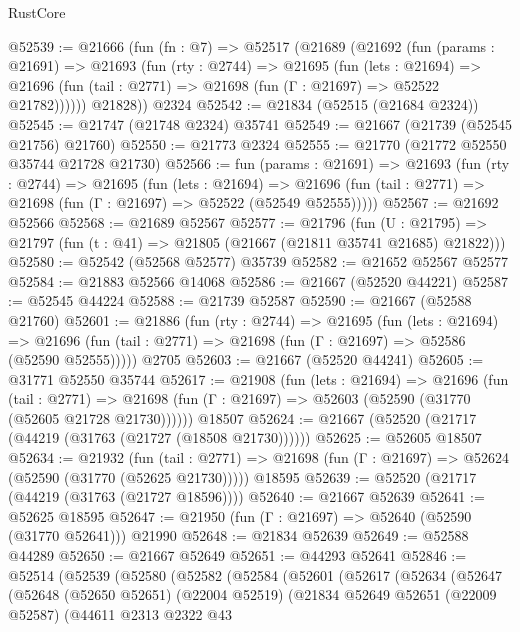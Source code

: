 \begin{lexlean}{RustCore}
\begin{coremodule}
@52539 := @21666
    (fun (fn : @7) =>
    @52517
      (@21689
        (@21692
          (fun (params : @21691) =>
          @21693
            (fun (rty : @2744) =>
            @21695
              (fun (lets : @21694) =>
              @21696 (fun (tail : @2771) => @21698 (fun (Γ : @21697) => @52522 @21782))))))
        @21828))
    @2324
@52542 := @21834 (@52515 (@21684 @2324))
@52545 := @21747 (@21748 @2324) @35741
@52549 := @21667 (@21739 (@52545 @21756) @21760)
@52550 := @21773 @2324
@52555 := @21770 (@21772 @52550 @35744 @21728 @21730)
@52566 := fun (params : @21691) =>
  @21693
    (fun (rty : @2744) =>
    @21695
      (fun (lets : @21694) =>
      @21696 (fun (tail : @2771) => @21698 (fun (Γ : @21697) => @52522 (@52549 @52555)))))
@52567 := @21692 @52566
@52568 := @21689 @52567
@52577 := @21796
    (fun (U : @21795) => @21797 (fun (t : @41) => @21805 (@21667 (@21811 @35741 @21685) @21822)))
@52580 := @52542 (@52568 @52577) @35739
@52582 := @21652 @52567 @52577
@52584 := @21883 @52566 @14068
@52586 := @21667 (@52520 @44221)
@52587 := @52545 @44224
@52588 := @21739 @52587
@52590 := @21667 (@52588 @21760)
@52601 := @21886
    (fun (rty : @2744) =>
    @21695
      (fun (lets : @21694) =>
      @21696 (fun (tail : @2771) => @21698 (fun (Γ : @21697) => @52586 (@52590 @52555)))))
    @2705
@52603 := @21667 (@52520 @44241)
@52605 := @31771 @52550 @35744
@52617 := @21908
    (fun (lets : @21694) =>
    @21696
      (fun (tail : @2771) =>
      @21698 (fun (Γ : @21697) => @52603 (@52590 (@31770 (@52605 @21728 @21730))))))
    @18507
@52624 := @21667 (@52520 (@21717 (@44219 (@31763 (@21727 (@18508 @21730))))))
@52625 := @52605 @18507
@52634 := @21932
    (fun (tail : @2771) => @21698 (fun (Γ : @21697) => @52624 (@52590 (@31770 (@52625 @21730)))))
    @18595
@52639 := @52520 (@21717 (@44219 (@31763 (@21727 @18596))))
@52640 := @21667 @52639
@52641 := @52625 @18595
@52647 := @21950 (fun (Γ : @21697) => @52640 (@52590 (@31770 @52641))) @21990
@52648 := @21834 @52639
@52649 := @52588 @44289
@52650 := @21667 @52649
@52651 := @44293 @52641
@52846 := @52514
    (@52539
      (@52580
        (@52582
          (@52584
            (@52601
              (@52617
                (@52634
                  (@52647
                    (@52648
                      (@52650 @52651)
                      (@22004 @52519)
                      (@21834
                        @52649
                        @52651
                        (@22009 @52587)
                        (@44611
                          @2313
                          @2322
                          @43

\end{coremodule}
\end{lexlean}
